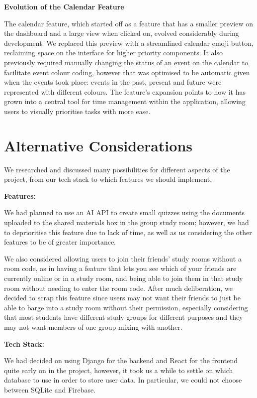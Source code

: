 \textbf{Evolution of the Calendar Feature}

The calendar feature, which started off as a feature that has a smaller preview on the dashboard and a large view when clicked on, evolved considerably during development. We replaced this preview with a streamlined calendar emoji button, reclaiming space on the interface for higher priority components. It also previously required manually changing the status of an event on the calendar to facilitate event colour coding, however that was optimised to be automatic given when the events took place: events in the past, present and future were represented with different colours. The feature's expansion points to how it has grown into a central tool for time management within the application, allowing users to visually prioritise tasks with more ease.

\section{Alternative Considerations}
\label{sect:alternative-considerations}
We researched and discussed many possibilities for different aspects of the project, from our tech stack to which features we should implement.

\textbf{Features:}

We had planned to use an AI API to create small quizzes using the documents uploaded to the shared materials box in the group study room; however, we had to deprioritise this feature due to lack of time, as well as us considering the other features to be of greater importance.

We also considered allowing users to join their friends' study rooms without a room code, as in having a feature that lets you see which of your friends are currently online or in a study room, and being able to join them in that study room without needing to enter the room code. After much deliberation, we decided to scrap this feature since users may not want their friends to just be able to barge into a study room without their permission, especially considering that most students have different study groups for different purposes and they may not want members of one group mixing with another.


\textbf{Tech Stack:}

We had decided on using Django for the backend and React for the frontend quite early on in the project, however, it took us a while to settle on which database to use in order to store user data. In particular, we could not choose between SQLite and Firebase. 

